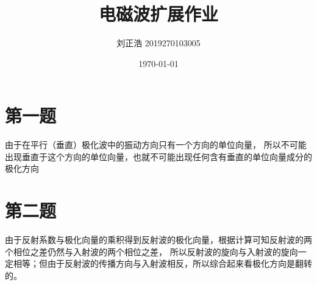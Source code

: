 \documentclass[a4paper]{article}
\title{\heiti\zihao{2} 电磁波扩展作业}				%
\author{\songti 刘正浩 2019270103005}
\date{\today}
\begin{document}
	\maketitle
	\thispagestyle{empty}


	\tableofcontents

	\section{第一题}
		由于在平行（垂直）极化波中的振动方向只有一个方向的单位向量，
		所以不可能出现垂直于这个方向的单位向量，也就不可能出现任何含有垂直的单位向量成分的极化方向

	\section{第二题}
		由于反射系数与极化向量的乘积得到反射波的极化向量，根据计算可知反射波的两个相位之差仍然与入射波的两个相位之差，
		所以反射波的旋向与入射波的旋向一定相等；但由于反射波的传播方向与入射波相反，所以综合起来看极化方向是翻转的。
	
\end{document}
